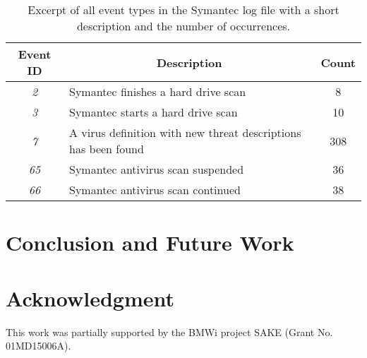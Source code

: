 \documentclass[journal, 10pt]{IEEEtran}
\begin{document}
\begin{table}[!ht]
	\caption{Excerpt of all event types in the Symantec log file with a short description and the number of occurrences.}
	\label{tab:symantecEvents}

	\centering
	\begin{tabular}{c p{} c}
		Event ID & \multicolumn{1}{c}{Description} & Count \\
		\hline
		\textit{2}	& Symantec finishes a hard drive scan & 8 \\
		\textit{3}	& Symantec starts a hard drive scan & 10 \\
		\textit{7}	& A virus definition with new threat descriptions has been found & 308 \\
		\textit{65}	& Symantec antivirus scan suspended & 36 \\
		\textit{66}	& Symantec antivirus scan continued & 38 \\
	\end{tabular}

\end{table}

\section{Conclusion and Future Work}
\label{sec:conclusion}
%


\appendices
\section*{Acknowledgment}
This work was partially supported by the BMWi project SAKE (Grant No. 01MD15006A).


\ifCLASSOPTIONcaptionsoff
  \newpage
\fi






\end{document}
